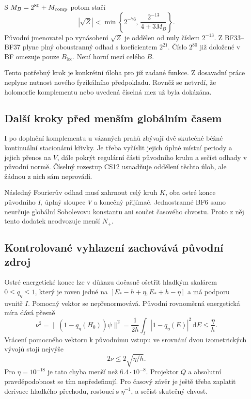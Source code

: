 \documentclass[11pt,a4paper]{article}
\theoremstyle{remark}\newtheorem{remark}[theorem]{Poznámka}
\numberwithin{equation}{section}
\begin{document}
S \(M_B=2^{80}+M_{\rm comp}\) potom stačí
\[
|\sqrt Z|<\min\left\{2^{-76},\,
\frac{2^{-13}}{4+3M_B}\right\}.
\]
Původní jmenovatel po vynásobení \(\sqrt Z\) je oddělen
od nuly číslem \(2^{-13}\). Z BF33--BF37 plyne plný
oboustranný odhad s koeficientem \(2^{21}\).
Číslo \(2^{80}\) již doložené v BF omezuje pouze
\(B_{\mathrm{loc}}\). Není horní mezí celého \(B\).

Tento potřebný krok je konkrétní úloha pro již zadané
funkce. Z dosavadní práce neplyne nutnost nového fyzikálního
předpokladu. Rovněž se netvrdí, že holomorfie komplementu
nebo uvedená číselná mez už byla dokázána.

\subsection{Další kroky před menším globálním časem}

I po doplnění komplementu u vázaných prahů zbývají dvě
skutečné běžné kontinuální stacionární křivky. Je třeba
vyčíslit jejich úplné místní periody a jejich přenos na
\(V\), dále pokrýt regulární části původního kruhu a
sečíst odhady v původní normě. Číselný rozestup CS12
usnadňuje oddělení těchto úloh, ale žádnou z nich sám
neprovádí.

Následný Fourierův odhad musí zahrnout celý kruh \(K\),
oba ostré konce původního \(I\), úplný sloupec \(V\)
a konečný přijímač. Jednostranné BF6 samo neurčuje
globální Sobolevovu konstantu ani součet časového chvostu.
Proto z něj tento dodatek neodvozuje menší \(N_+\).

\subsection{Kontrolované vyhlazení zachovává původní zdroj}

Ostré energetické konce lze v důkazu dočasně ošetřit
hladkým skalárem \(0\le q_\eta\le1\), který je roven
jedné na \([E_*-h+\eta,E_*+h-\eta]\) a má podporu
uvnitř \(I\). Pomocný vektor se nepřenormovává.
Původní rovnoměrná energetická míra dává přesně
\[
\nu^2=\|(1-q_\eta(H_0))\psi\|^2
=\frac1{2h}\int_I|1-q_\eta(E)|^2\,\mathrm dE
\le\frac\eta h.
\]
Vrácení pomocného vektoru k původnímu vstupu ve srovnání
dvou izometrických vývojů stojí nejvýše
\[
2\nu\le2\sqrt{\eta/h}.
\]
Pro \(\eta=10^{-18}\) je tato chyba menší než
\(6.4\cdot10^{-8}\). Projektor \(Q\) a absolutní
pravděpodobnost se tím nepředefinují. Pro časový závěr
je ještě třeba zaplatit derivace hladkého přechodu,
rostoucí s \(\eta^{-1}\), a sečíst skutečný chvost.
\end{document}
